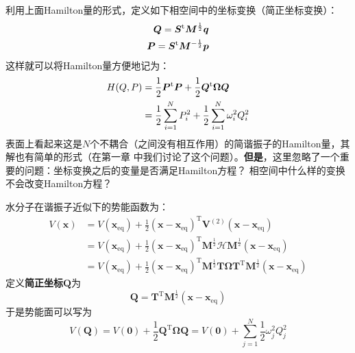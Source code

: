    利用上面Hamilton量的形式，定义如下相空间中的坐标变换（简正坐标变换）：
    \begin{equation}
        \begin{split}
            \bm{Q} = \bm{S}^{\mathrm{t}}\bm{M}^{\frac{1}{2}}\bm{q}\\
            \bm{P} = \bm{S}^{\mathrm{t}}\bm{M}^{-\frac{1}{2}}\bm{p}
        \end{split}
        \label{normal mode transformation}
    \end{equation}
    这样就可以将Hamilton量方便地记为：
    \begin{equation}
        \begin{split}
        H(Q,P) &= \frac{1}{2}\bm{P}^{\mathrm{t}}\bm{P} + \frac{1}{2}\bm{Q}^{\mathrm{t}}\bm{\Omega}\bm{Q}\\
        & = \frac{1}{2}\sum_{i=1}^{N}P_{i}^2 + \frac{1}{2}\sum_{i=1}^{N}\omega_{i}^2Q_{i}^{2}
        \end{split}
    \end{equation}
    表面上看起来这是$N$个不耦合（之间没有相互作用）的简谐振子的Hamilton量，其解也有简单的形式（在第一章
    中我们讨论了这个问题）。\textbf{但是}，这里忽略了一个重要的问题：坐标变换之后的变量是否满足Hamilton方程？
    相空间中什么样的变换不会改变Hamilton方程？

    水分子在谐振子近似下的势能函数为：
    \begin{align*}
        V(\bm{x}) &= V(\bm{x}_\mathrm{eq}) + \frac 12 (\bm{x-x}_\mathrm{eq})^\mathrm{T} \bm{V}^{(2)} (\bm{x-x}_\mathrm{eq})\\
        &= V(\bm{x}_\mathrm{eq}) + \frac 12 (\bm{x-x}_\mathrm{eq})^\mathrm{T} \bm{M}^{\frac 12}\bm{\mathcal{H}} \bm{M}^{\frac 12} (\bm{x-x}_\mathrm{eq})\\
        &= V(\bm{x}_\mathrm{eq}) + \frac 12 (\bm{x-x}_\mathrm{eq})^\mathrm{T} \bm{M}^{\frac 12} \bm{T\Omega T}^\mathrm{T} \bm{M}^{\frac 12} (\bm{x-x}_\mathrm{eq})
    \end{align*}
    定义\textbf{简正坐标}$\bm{Q}$为
    \begin{equation*}
        \bm{Q} = \bm{T}^\mathrm{T} \bm{M}^{\frac 12} (\bm{x-x}_\mathrm{eq})
    \end{equation*}
    于是势能面可以写为
    \begin{equation*}
        V(\bm{Q}) = V(\bm{0}) + \frac 12 \bm{Q}^\mathrm{T} \bm{\Omega Q} = V(\bm{0}) + \sum_{j=1}^N \frac 12 \omega_j^2 Q_j^2
    \end{equation*}

